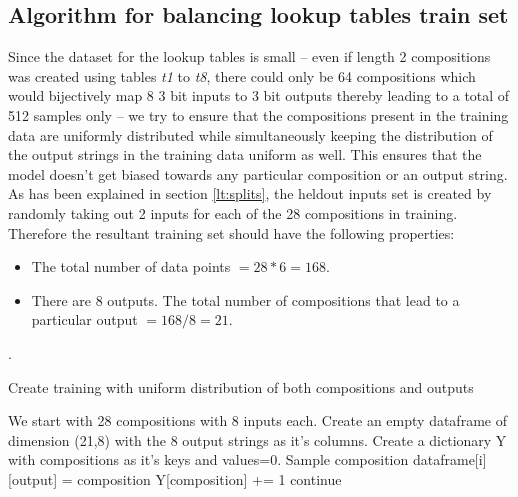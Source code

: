 \begin{appendix}
	
\chapter{Algorithm for balancing lookup tables train set}\label{Chapter:results}

Since the dataset for the lookup tables is small -- even if length 2 compositions was created using tables \textit{t1} to \textit{t8}, there could only be 64 compositions which would bijectively map 8 3 bit inputs to 3 bit outputs thereby leading to a total of 512 samples only -- we try to ensure that the compositions present in the training data are uniformly distributed while simultaneously keeping the distribution of the output strings in the training data uniform as well. This ensures that the model doesn't get biased towards any particular composition or an output string. As has been explained in section \ref{lt:splits}, the heldout inputs set is created by randomly taking out 2 inputs for each of the 28 compositions in training. Therefore the resultant training set should have the following properties:
\begin{itemize}
	\item The total number of data points  $= 28*6 = 168$.
	\item There are 8 outputs. The total number of compositions that lead to a particular output $=168/8 = 21$.
\end{itemize}

.
\begin{algorithm}
	\caption{Create training with uniform distribution of both compositions and outputs}
	\begin{algorithmic}
		\STATE We start with 28 compositions with 8 inputs each.
		\STATE Create an empty dataframe of dimension (21,8) with the 8 output strings as it's columns.
		\STATE Create a dictionary Y with compositions as it's keys and values=0.
		\FOR {i in range [0, 21)}
		\STATE Sample composition
		\STATE dataframe[i][output] = composition
		\STATE Y[composition] += 1
		\ELSE
		\STATE continue
		\ENDIF
		\ENDFOR
		\ENDFOR		
	\end{algorithmic}
\end{algorithm}

\end{appendix}